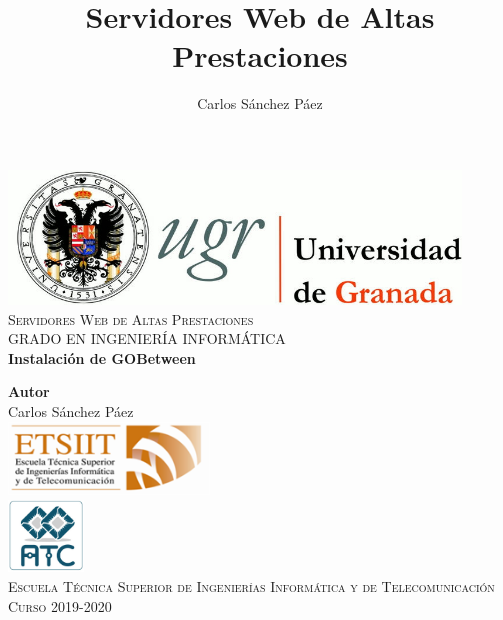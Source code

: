 \documentclass[12pt,spanish]{article}
\title{Servidores Web de Altas Prestaciones}
\author{Carlos Sánchez Páez}
\begin{document}
\lstset{columns=fullflexible,basicstyle=\ttfamily}


\begin{titlepage}

 \newlength{\centeroffset}
 \setlength{\centeroffset}{-0.5\oddsidemargin}
 \addtolength{\centeroffset}{0.5\evensidemargin}
 \thispagestyle{empty}

 \noindent\hspace*{\centeroffset}
 \begin{minipage}{\textwidth}

  \centering
  \includegraphics[width=0.9\textwidth]{logo_ugr.jpg}\\[1.4cm]

  \textsc{ \Large Servidores Web de Altas Prestaciones\\[0.2cm]}
  \textsc{GRADO EN INGENIERÍA INFORMÁTICA}\\[1cm]

  {\Huge\bfseries Instalación de GOBetween \\}
 \end{minipage}

 \vspace{1.5cm}
 \noindent\hspace*{\centeroffset}
 \begin{minipage}{\textwidth}
  \centering

  \textbf{Autor}\\ {Carlos Sánchez Páez}\\[2.5ex]
  \includegraphics[width=0.4\textwidth]{etsiit_logo.png}\\[0.1cm]
  \vspace{1.5cm}
  \includegraphics[width=0.15\textwidth]{atc.jpg}\\[0.1cm]
  \vspace{1cm}
  \textsc{Escuela Técnica Superior de Ingenierías Informática y de Telecomunicación}\\
  \vspace{1cm}
  \textsc{Curso 2019-2020}
 \end{minipage}
\end{titlepage}
\thispagestyle{empty}
\newpage
\tableofcontents{}
\newpage
\end{document}
